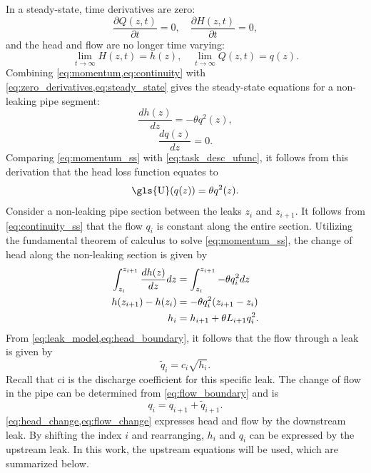 In a steady-state, time derivatives are zero:
\begin{equation}\label{eq:zero_derivatives}
    \frac{\partial Q(z,t)}{\partial t}=0, \quad \frac{\partial H(z,t)}{\partial t}=0,
\end{equation}
and the head and flow are no longer time varying:
\begin{equation}\label{eq:steady_state}
    \lim_{t\rightarrow\infty} H(z,t)=h(z), \quad \lim_{t\rightarrow\infty} Q(z,t)=q(z).
\end{equation}
Combining \cref{eq:momentum,eq:continuity} with \cref{eq:zero_derivatives,eq:steady_state} gives the steady-state equations for a non-leaking pipe segment:
\begin{equation}\label{eq:momentum_ss}
\frac{d h(z)}{d z}
= -\theta q^{2}(z),
\end{equation}
\begin{equation}\label{eq:continuity_ss}
\frac{d q(z)}{d z} = 0.
\end{equation}
Comparing \cref{eq:momentum_ss} with \cref{eq:task_desc_ufunc}, it follows from this derivation that the head loss function equates to
\[
    \text{\gls{U}} (q(z)) = \theta q^{2}(z).
\]
Consider a non-leaking pipe section between the leaks $z_i$ and $z_{i+1}$. It follows from \cref{eq:continuity_ss} that the flow $q_i$ is constant along the entire section. Utilizing the fundamental theorem of calculus to solve \cref{eq:momentum_ss},  the change of head along the non-leaking section is given by
\begin{align}
    \int_{z_i}^{z_{i+1}} \frac{d h(z)}{d z} dz &= \int_{z_i}^{z_{i+1}} -\theta q_i^{2} dz  \notag \\
    h(z_{i+1}) - h(z_i) &= -\theta q_i^{2} (z_{i+1}-z_i) \notag \\ 
    h_i &= h_{i+1} + \theta L_{i+1} q_i^{2} \label{eq:head_change}.
\end{align}
From \cref{eq:leak_model,eq:head_boundary}, it follows that the flow through a leak is given by
\begin{equation*}
    \tilde{q}_i = c_i\sqrt{h_i}.
\end{equation*}
Recall that \gls{ci} is the discharge coefficient for this specific leak. The change of flow in the pipe can be determined from \cref{eq:flow_boundary} and is
\begin{equation} \label{eq:flow_change}
    q_{i} = q_{i+1}+\tilde{q}_{i+1}.
\end{equation}
\cref{eq:head_change,eq:flow_change} expresses head and flow by the downstream leak. By shifting the index $i$ and rearranging, $h_i$ and $q_i$ can be expressed by the upstream leak. In this work, the upstream equations will be used, which are summarized below.

